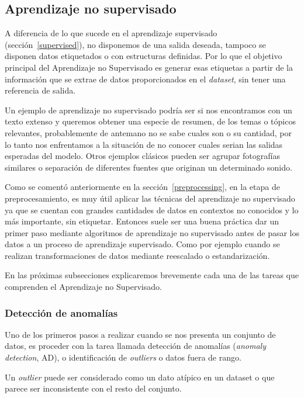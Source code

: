 \documentclass[a4paper,12pt]{article}
\begin{document}
\clearpage

\subsection{Aprendizaje no supervisado} \label{unsupervised}

A diferencia de lo que sucede en el aprendizaje supervisado (sección~\ref{supervised}), no disponemos de una salida deseada, tampoco se disponen datos etiquetados o con estructuras definidas. Por lo que el objetivo principal del Aprendizaje no Supervisado es generar esas etiquetas a partir de la información que se extrae de datos proporcionados en el \textit{dataset}, sin tener una referencia de salida.  

Un ejemplo de aprendizaje no supervisado podría ser si nos encontramos con un texto extenso y queremos obtener una especie de resumen, de los temas o tópicos relevantes, probablemente de antemano no se sabe cuales son o su cantidad, por lo tanto nos enfrentamos a la situación de no conocer cuales serian las salidas esperadas del modelo. 
Otros ejemplos clásicos pueden ser agrupar fotografías similares o separación de diferentes fuentes que originan un determinado sonido. 

Como se comentó anteriormente en la sección~\ref{preprocessing}, en la etapa de preprocesamiento, es muy útil aplicar las técnicas del aprendizaje no supervisado ya que se cuentan con grandes cantidades de datos en contextos no conocidos y lo más importante, sin etiquetar. Entonces suele ser una buena práctica dar un primer paso mediante algoritmos de aprendizaje no supervisado antes de pasar los datos a un proceso de aprendizaje supervisado. Como por ejemplo cuando se realizan transformaciones de datos mediante reescalado o estandarización. 

En las próximas subsecciones explicaremos brevemente cada una de las tareas que comprenden el Aprendizaje no Supervisado.

\subsubsection{Detección de anomalías}

Uno de los primeros pasos a realizar cuando se nos presenta un conjunto de datos, es proceder con la tarea llamada detección de anomalías (\textit{anomaly detection}, AD), o identificación de \textit{outliers} o datos fuera de rango. 

Un \textit{outlier} puede ser considerado como un dato atípico en un dataset o que parece ser inconsistente con el resto del conjunto.
\end{document}
